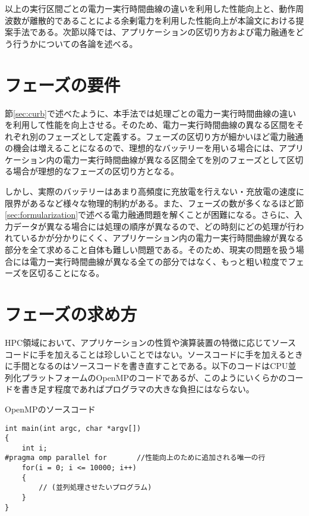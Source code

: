 以上の実行区間ごとの電力ー実行時間曲線の違いを利用した性能向上と、動作周波数が離散的であることによる余剰電力を利用した性能向上が本論文における提案手法である。次節以降では、アプリケーションの区切り方および電力融通をどう行うかについての各論を述べる。


\section{フェーズの要件}
\label{sec:phase1}

節\ref{sec:curb}で述べたように、本手法では処理ごとの電力ー実行時間曲線の違いを利用して性能を向上させる。そのため、電力ー実行時間曲線の異なる区間をそれぞれ別のフェーズとして定義する。フェーズの区切り方が細かいほど電力融通の機会は増えることになるので、理想的なバッテリーを用いる場合には、アプリケーション内の電力ー実行時間曲線が異なる区間全てを別のフェーズとして区切る場合が理想的なフェーズの区切り方となる。

しかし、実際のバッテリーはあまり高頻度に充放電を行えない・充放電の速度に限界があるなど様々な物理的制約がある。また、フェーズの数が多くなるほど節\ref{sec:formularization}で述べる電力融通問題を解くことが困難になる。さらに、入力データが異なる場合には処理の順序が異なるので、どの時刻にどの処理が行われているかが分かりにくく、アプリケーション内の電力ー実行時間曲線が異なる部分を全て求めること自体も難しい問題である。そのため、現実の問題を扱う場合には電力ー実行時間曲線が異なる全ての部分ではなく、もっと粗い粒度でフェーズを区切ることになる。

\section{フェーズの求め方}
\label{sec:phase2}

HPC領域において、アプリケーションの性質や演算装置の特徴に応じてソースコードに手を加えることは珍しいことではない。ソースコードに手を加えるときに手間となるのはソースコードを書き直すことである。以下のコードはCPU並列化プラットフォームのOpenMPのコードであるが、このようにいくらかのコードを書き足す程度であればプログラマの大きな負担にはならない。

{\small
\begin{itembox}[c]{OpenMPのソースコード}
\begin{verbatim}
int main(int argc, char *argv[])
{
    int i;
#pragma omp parallel for       //性能向上のために追加される唯一の行
    for(i = 0; i <= 10000; i++)
    {
        // (並列処理させたいプログラム)
    }
}
\end{verbatim}
\end{itembox}}

